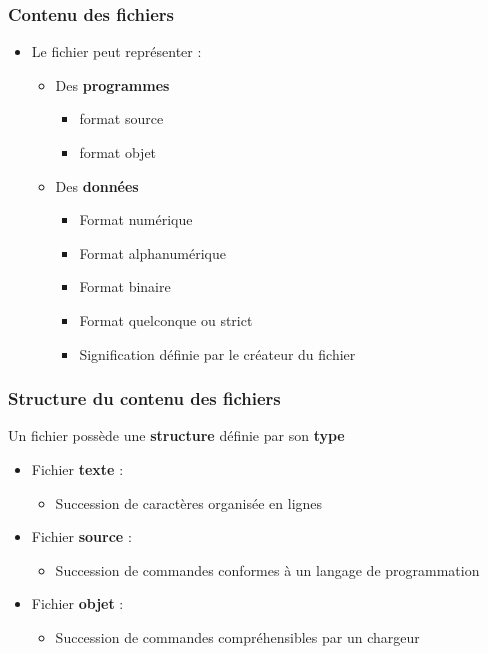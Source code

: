\begin{frame}
\frametitle{Contenu des fichiers}
\begin{itemize}
\item Le fichier peut représenter :
\begin{itemize}
\item Des \textbf{programmes}
\begin{itemize}
\item format source
\item format objet
\end{itemize}
\item Des \textbf{données}
\begin{itemize}
\item Format numérique
\item Format alphanumérique
\item Format binaire
\item Format quelconque ou strict
\item Signification définie par le créateur du fichier
\end{itemize}
\end{itemize}
\end{itemize}
\end{frame}


\begin{frame}
\frametitle{Structure du contenu des fichiers}
Un fichier possède une \textbf{structure} définie par son \textbf{type}
\begin{itemize}
\item Fichier \textbf{texte} : 
\begin{itemize}
\item Succession de caractères organisée en lignes
\end{itemize}
\item Fichier \textbf{source} :
\begin{itemize}
\item Succession de commandes conformes à un langage de programmation
\end{itemize}
\item Fichier \textbf{objet} :
\begin{itemize}
\item Succession de commandes compréhensibles par un chargeur
\end{itemize}
\end{itemize}
\end{frame}



